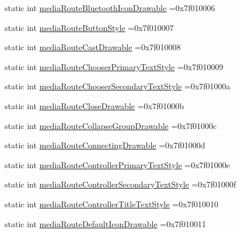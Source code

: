 \begin{DoxyCompactItemize}
static int \hyperlink{classandroid_1_1support_1_1graphics_1_1drawable_1_1animated_1_1R_1_1attr_afc98ce6ee1843a104db7978578f72685}{media\+Route\+Bluetooth\+Icon\+Drawable} =0x7f010006
\item 
static int \hyperlink{classandroid_1_1support_1_1graphics_1_1drawable_1_1animated_1_1R_1_1attr_a73253e2c73eed54fdba9edfae55fc2d8}{media\+Route\+Button\+Style} =0x7f010007
\item 
static int \hyperlink{classandroid_1_1support_1_1graphics_1_1drawable_1_1animated_1_1R_1_1attr_aa17695fd47ff6b4a55bae6d1bd6b3f8c}{media\+Route\+Cast\+Drawable} =0x7f010008
\item 
static int \hyperlink{classandroid_1_1support_1_1graphics_1_1drawable_1_1animated_1_1R_1_1attr_abce8e49aec8411478d953c68a4d82276}{media\+Route\+Chooser\+Primary\+Text\+Style} =0x7f010009
\item 
static int \hyperlink{classandroid_1_1support_1_1graphics_1_1drawable_1_1animated_1_1R_1_1attr_aec59c19b7c84306faf9e554565b28f1d}{media\+Route\+Chooser\+Secondary\+Text\+Style} =0x7f01000a
\item 
static int \hyperlink{classandroid_1_1support_1_1graphics_1_1drawable_1_1animated_1_1R_1_1attr_ac986fc219ec6b94b0846d272aa60d8a0}{media\+Route\+Close\+Drawable} =0x7f01000b
\item 
static int \hyperlink{classandroid_1_1support_1_1graphics_1_1drawable_1_1animated_1_1R_1_1attr_a2da948098f67f3775cbf1b66a38f2bcb}{media\+Route\+Collapse\+Group\+Drawable} =0x7f01000c
\item 
static int \hyperlink{classandroid_1_1support_1_1graphics_1_1drawable_1_1animated_1_1R_1_1attr_af1a6b58c7146753dfaa0b8dcfaf7d92c}{media\+Route\+Connecting\+Drawable} =0x7f01000d
\item 
static int \hyperlink{classandroid_1_1support_1_1graphics_1_1drawable_1_1animated_1_1R_1_1attr_a836ce68f9f7a27adf2033da32d0db2e8}{media\+Route\+Controller\+Primary\+Text\+Style} =0x7f01000e
\item 
static int \hyperlink{classandroid_1_1support_1_1graphics_1_1drawable_1_1animated_1_1R_1_1attr_a31df8e5418ee146b65b8c1e7efc2418c}{media\+Route\+Controller\+Secondary\+Text\+Style} =0x7f01000f
\item 
static int \hyperlink{classandroid_1_1support_1_1graphics_1_1drawable_1_1animated_1_1R_1_1attr_ad44cb4977843c909572062da6b17f9be}{media\+Route\+Controller\+Title\+Text\+Style} =0x7f010010
\item 
static int \hyperlink{classandroid_1_1support_1_1graphics_1_1drawable_1_1animated_1_1R_1_1attr_aaca24426ad9bd0a8d4f0f2d2ad45ea43}{media\+Route\+Default\+Icon\+Drawable} =0x7f010011

\end{DoxyCompactItemize}
